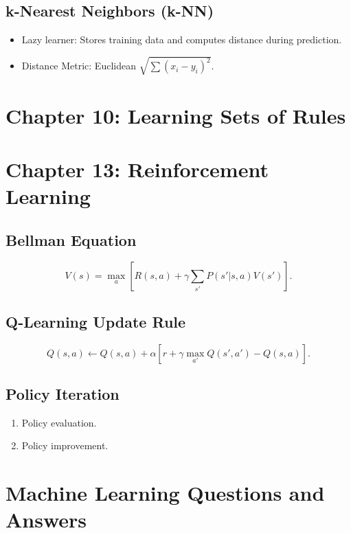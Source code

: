\documentclass[10pt,a4paper]{article}
\begin{document}
\subsection*{k-Nearest Neighbors (k-NN)}
\begin{itemize}
	\item Lazy learner: Stores training data and computes distance during prediction.
	\item Distance Metric: Euclidean \( \sqrt{\sum (x_i - y_i)^2} \).
\end{itemize}


\section*{Chapter 10: Learning Sets of Rules}

\section*{Chapter 13: Reinforcement Learning}
\subsection*{Bellman Equation}
\[
V(s) = \max_a \left[ R(s, a) + \gamma \sum_{s'} P(s'|s, a)V(s') \right].
\]

\subsection*{Q-Learning Update Rule}
\[
Q(s, a) \leftarrow Q(s, a) + \alpha \left[ r + \gamma \max_{a'} Q(s', a') - Q(s, a) \right].
\]

\subsection*{Policy Iteration}
\begin{enumerate}
    \item Policy evaluation.
    \item Policy improvement.
\end{enumerate}


\section*{Machine Learning Questions and Answers}
\end{document}
